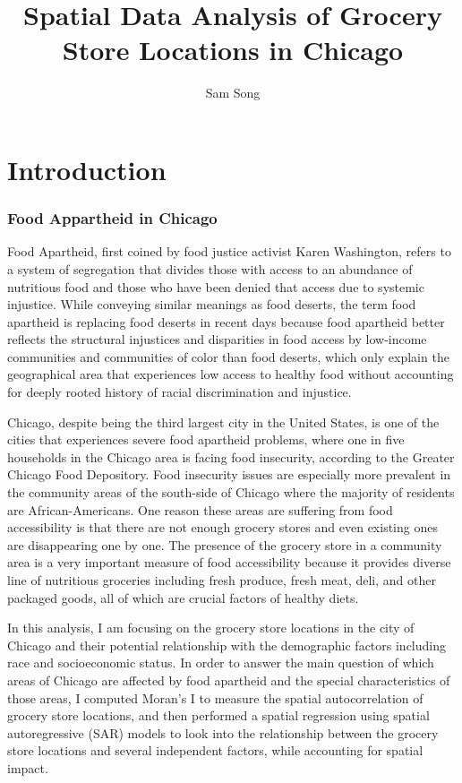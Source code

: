 \documentclass[
]{article}
\title{Spatial Data Analysis of Grocery Store Locations in Chicago}
\author{Sam Song}
\date{}
\begin{document}
\maketitle

\hypertarget{introduction}{%
\section{\texorpdfstring{\textbf{Introduction}}{Introduction}}\label{introduction}}

\hypertarget{food-appartheid-in-chicago}{%
\subsubsection{Food Appartheid in
Chicago}\label{food-appartheid-in-chicago}}

Food Apartheid, first coined by food justice activist Karen Washington,
refers to a system of segregation that divides those with access to an
abundance of nutritious food and those who have been denied that access
due to systemic injustice. While conveying similar meanings as food
deserts, the term food apartheid is replacing food deserts in recent
days because food apartheid better reflects the structural injustices
and disparities in food access by low-income communities and communities
of color than food deserts, which only explain the geographical area
that experiences low access to healthy food without accounting for
deeply rooted history of racial discrimination and injustice.

Chicago, despite being the third largest city in the United States, is
one of the cities that experiences severe food apartheid problems, where
one in five households in the Chicago area is facing food insecurity,
according to the Greater Chicago Food Depository. Food insecurity issues
are especially more prevalent in the community areas of the south-side
of Chicago where the majority of residents are African-Americans. One
reason these areas are suffering from food accessibility is that there
are not enough grocery stores and even existing ones are disappearing
one by one. The presence of the grocery store in a community area is a
very important measure of food accessibility because it provides diverse
line of nutritious groceries including fresh produce, fresh meat, deli,
and other packaged goods, all of which are crucial factors of healthy
diets.

In this analysis, I am focusing on the grocery store locations in the
city of Chicago and their potential relationship with the demographic
factors including race and socioeconomic status. In order to answer the
main question of which areas of Chicago are affected by food apartheid
and the special characteristics of those areas, I computed Moran's I to
measure the spatial autocorrelation of grocery store locations, and then
performed a spatial regression using spatial autoregressive (SAR) models
to look into the relationship between the grocery store locations and
several independent factors, while accounting for spatial impact.
\end{document}
